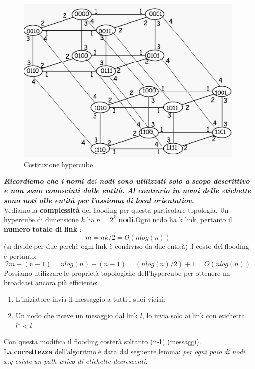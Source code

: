 \documentclass[12pt]{article}
\begin{document}
			\begin{figure}[h!]
				\centering
				\includegraphics[scale=0.20]{img/hyper2.png}
				\caption{Costruzione hypercube}
			\end{figure}
			\textbf{\textit{Ricordiamo che i nomi dei nodi sono utilizzati solo a scopo descrittivo e non sono conosciuti dalle entità. Al contrario in nomi delle etichette sono noti alle entità per l'assioma di local orientation}.}\\
			Vediamo la \textbf{complessità} del flooding per questa particolare topologia. Un hypercube di dimensione $k$ ha $n=2^{k}$ \textbf{nodi}.Ogni nodo ha k link, pertanto il \textbf{numero totale di link }:
			$$m=nk/2= O(nlog(n)) $$ (si divide per due perchè ogni link è condiviso da due entità) il costo del flooding è pertanto:
			$$2m-(n-1) = nlog(n)-(n-1)=(nlog(n)/2) +1=O(nlog(n))$$
			Possiamo utilizzare le proprietà topologiche dell'hypercube per ottenere un broadcast ancora più efficiente:
			\begin{enumerate}
				\item L'iniziatore invia il messaggio a tutti i suoi vicini;
				\item Un nodo che riceve un mesaggio dal link $l$, lo invia solo ai link con etichetta $l^{1}<l$ 
			\end{enumerate}
			Con questa modifica il flooding costerà soltanto (n-1) (messaggi).\\
			La \textbf{correttezza} dell'algoritmo è data dal seguente lemma: \textit{per ogni paio di nodi x,y esiste un path unico di etichette decrescenti}.
\end{document}
